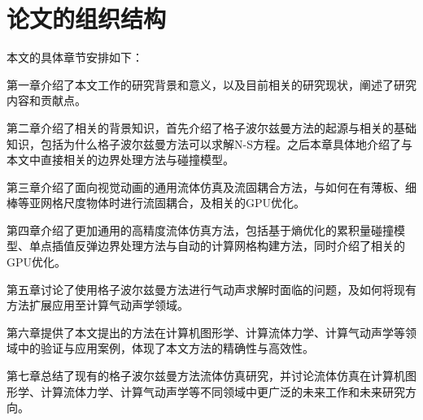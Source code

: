 \section{论文的组织结构}
本文的具体章节安排如下：

第一章介绍了本文工作的研究背景和意义，以及目前相关的研究现状，阐述了研究内容和贡献点。

第二章介绍了相关的背景知识，首先介绍了格子波尔兹曼方法的起源与相关的基础知识，包括为什么格子波尔兹曼方法可以求解N-S方程。之后本章具体地介绍了与本文中直接相关的边界处理方法与碰撞模型。

第三章介绍了面向视觉动画的通用流体仿真及流固耦合方法，与如何在有薄板、细棒等亚网格尺度物体时进行流固耦合，及相关的GPU优化。

第四章介绍了更加通用的高精度流体仿真方法，包括基于熵优化的累积量碰撞模型、单点插值反弹边界处理方法与自动的计算网格构建方法，同时介绍了相关的GPU优化。

第五章讨论了使用格子波尔兹曼方法进行气动声求解时面临的问题，及如何将现有方法扩展应用至计算气动声学领域。

第六章提供了本文提出的方法在计算机图形学、计算流体力学、计算气动声学等领域中的验证与应用案例，体现了本文方法的精确性与高效性。

第七章总结了现有的格子波尔兹曼方法流体仿真研究，并讨论流体仿真在计算机图形学、计算流体力学、计算气动声学等不同领域中更广泛的未来工作和未来研究方向。
